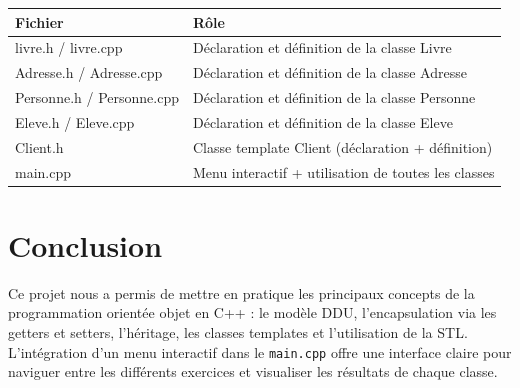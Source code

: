 \documentclass[12pt,a4paper]{article}
\begin{document}
\begin{center}
\begin{tabular}{>{\ttfamily}l l}
    \toprule
    \textbf{Fichier} & \textbf{R\^ole} \\
    \midrule
    livre.h / livre.cpp       & D\'eclaration et d\'efinition de la classe Livre \\
    Adresse.h / Adresse.cpp   & D\'eclaration et d\'efinition de la classe Adresse \\
    Personne.h / Personne.cpp & D\'eclaration et d\'efinition de la classe Personne \\
    Eleve.h / Eleve.cpp       & D\'eclaration et d\'efinition de la classe Eleve \\
    Client.h                  & Classe template Client (d\'eclaration + d\'efinition) \\
    main.cpp                  & Menu interactif + utilisation de toutes les classes \\
    \bottomrule
\end{tabular}
\end{center}

\section{Conclusion}

Ce projet nous a permis de mettre en pratique les principaux concepts de la programmation orientée objet en C++ : le modèle DDU, l'encapsulation via les getters et setters, l'héritage, les classes templates et l'utilisation de la STL. L'intégration d'un menu interactif dans le \texttt{main.cpp} offre une interface claire pour naviguer entre les différents exercices et visualiser les résultats de chaque classe.
\end{document}
